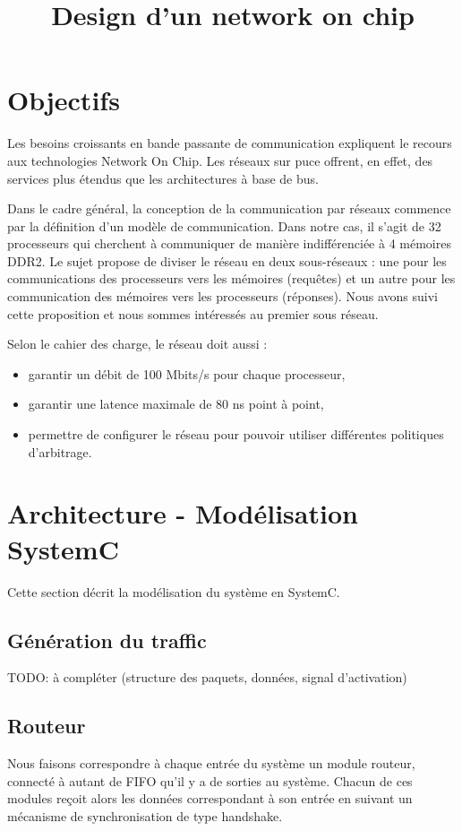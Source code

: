 \documentclass[11pt]{article}
\title{Design d'un network on chip}
\begin{document}
\maketitle

\section{Objectifs}

Les besoins croissants en bande passante de communication expliquent le recours aux technologies Network On Chip. Les réseaux sur puce offrent, en effet, des services plus étendus que les architectures à base de bus.

Dans le cadre général, la conception de la communication par réseaux commence par la définition d'un modèle de communication. Dans notre cas, il s'agit de 32 processeurs qui cherchent à communiquer de manière indifférenciée à 4 mémoires DDR2. Le sujet propose de diviser le réseau en deux sous-réseaux : une pour les communications des processeurs vers les mémoires (requêtes) et un autre pour les communication des mémoires vers les processeurs (réponses). Nous avons suivi cette proposition et nous sommes intéressés au premier sous réseau.

Selon le cahier des charge, le réseau doit aussi :
\begin{itemize}
\item garantir un débit de 100 Mbits/s pour chaque processeur,
\item garantir une latence maximale de 80 ns point à point,
\item permettre de configurer le réseau pour pouvoir utiliser différentes politiques d'arbitrage.
\end{itemize}

\section{Architecture - Modélisation SystemC}

Cette section décrit la modélisation du système en SystemC.

\subsection{Génération du traffic}
TODO: à compléter (structure des paquets, données, signal d'activation)

\subsection{Routeur}
Nous faisons correspondre à chaque entrée du système un module routeur, connecté à autant de FIFO qu'il y a de sorties au système.
Chacun de ces modules reçoit alors les données correspondant à son entrée en suivant un mécanisme de synchronisation de type handshake.
\end{document}
